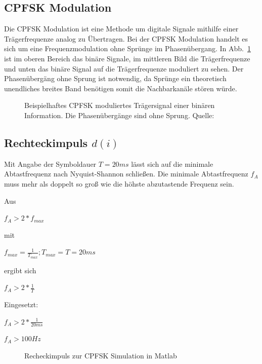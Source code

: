 \documentclass{article}
\begin{document}
\subsection{CPFSK Modulation}
Die \ac{CPFSK} Modulation ist eine Methode um digitale Signale mithilfe einer Trägerfrequenze analog zu Übertragen.
Bei der \ac{CPFSK} Modulation handelt es sich um eine Frequenzmodulation ohne Sprünge im Phasenübergang. In Abb.~\ref{fsk}
ist im oberen Bereich das binäre Signale, im mittleren Bild die Trägerfrequenze und unten das binäre Signal auf die Trägerfrequenze
moduliert zu sehen. Der Phasenübergäng ohne Sprung ist notwendig, da Sprünge ein theoretisch unendliches breites Band benötigen
somit die Nachbarkanäle stören würde.
\begin{figure}[!h]
    \centering
    \def\svgscale{0.3}
    \def\svgwidth{\columnwidth}
    
    \caption{Beispielhaftes \ac{CPFSK} moduliertes Trägersignal einer binären 
    Information. Die Phasenübergänge sind ohne Sprung. Quelle:~\cite{wiki:fsk}}
    \label{fsk}
\end{figure}
\subsection{Rechteckimpuls $d(i)$}\label{sec:rechteck}
Mit Angabe der Symboldauer $T = 20ms$ lässt sich auf die minimale Abtastfrequenz nach Nyquist-Shannon schließen.
Die minimale Abtastfrequenz $f_A$ muss mehr als doppelt so groß wie die höhste abzutastende Frequenz sein.


Aus
\begin{center}
 $
f_A > 2*f_{max}
$
\end{center}

mit 
\begin{center} $f_{max} = \frac{1}{T_{max}} ; T_{max} = T = 20ms$  \end{center}

ergibt sich

\begin{center}
$
f_A > 2*\frac{1}{T}
$
\end{center}

Eingesetzt:
\begin{center}
$f_A > 2*\frac{1}{20ms}$
\end{center}
\begin{center}
$f_A > 100Hz$   
\end{center}
\begin{figure}[!h]
    \centering
    \def\svgscale{0.3}
    \def\svgwidth{\columnwidth}
    
    \caption{Recheckimpuls zur \ac{CPFSK} Simulation in Matlab}
\end{figure}
\end{document}
